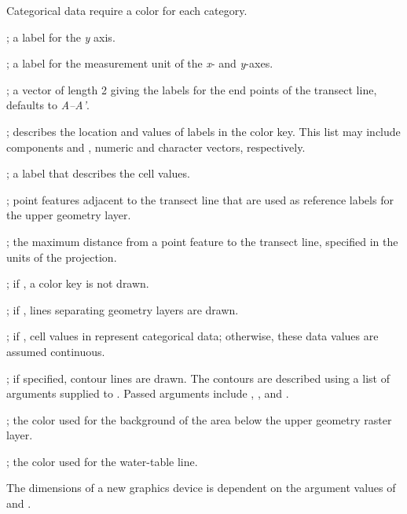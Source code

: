 \documentclass[letterpaper]{book}
\begin{document}
\begin{Arguments}
\begin{ldescription}
Categorical data require a color for each category.
\item[\code{ylab}] ; a label for the \emph{y} axis.
\item[\code{unit}] ; a label for the measurement unit of the \emph{x}- and \emph{y}-axes.
\item[\code{id}] ; a vector of length 2 giving the labels for the end points of the transect line, defaults to \emph{A--A'}.
\item[\code{labels}] ; describes the location and values of labels in the color key.
This list may include components  and , numeric and character vectors, respectively.
\item[\code{explanation}] ; a label that describes the cell values.
\item[\code{features}] ; point features adjacent to the transect line that are used as reference labels for the upper geometry layer.
\item[\code{max.feature.dist}] ; the maximum distance from a point feature to the transect line, specified in the units of the  projection.
\item[\code{draw.key}] ; if , a color key is not drawn.
\item[\code{draw.sep}] ; if , lines separating geometry layers are drawn.
\item[\code{is.categorical}] ; if , cell values in  represent categorical data; otherwise, these data values are assumed continuous.
\item[\code{contour.lines}] ; if specified, contour lines are drawn.
The contours are described using a list of arguments supplied to .
Passed arguments include , , and .
\item[\code{bg.col}] ; the color used for the background of the area below the upper geometry raster layer.
\item[\code{wt.col}] ; the color used for the water-table line.
\end{ldescription}
\end{Arguments}
%
\begin{Details}\relax
The dimensions of a new graphics device is dependent on the argument values of  and .
\end{Details}
\end{document}
